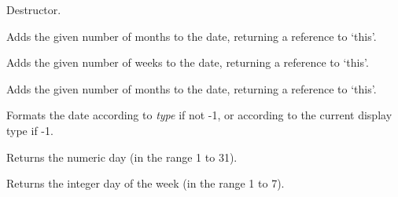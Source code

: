 Destructor.

\label{wxdateaddmonths}


Adds the given number of months to the date, returning a reference to `this'.

\label{wxdateaddweeks}


Adds the given number of weeks to the date, returning a reference to `this'.

\label{wxdateaddyears}


Adds the given number of months to the date, returning a reference to `this'.

\label{wxdateformatdate}


Formats the date according to {\it type} if not -1, or according
to the current display type if -1.



\label{wxdategetday}


Returns the numeric day (in the range 1 to 31).

\label{wxdategetdayofweek}


Returns the integer day of the week (in the range 1 to 7).

\label{wxdategetdayofweekname}


